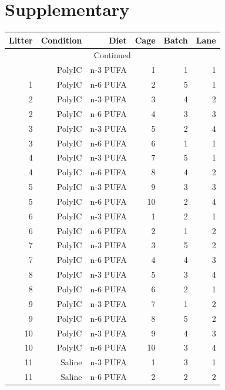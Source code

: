 \documentclass[12pt]{scrbook}
\begin{document}
\section{Supplementary}
\begin{center}
	\begin{longtable}[H]{rrrrrr}
		\toprule
		Litter & Condition & Diet  & Cage  & Batch & Lane \\
		\midrule
		\endhead
		\hline
		\multicolumn{6}{c}{Continued}\\
		\bottomrule
		\endfoot
		\bottomrule
		\endlastfoot
		1     & PolyIC & n-3 PUFA & 1     & 1     & 1 \\
		1     & PolyIC & n-6 PUFA & 2     & 5     & 1 \\
		2     & PolyIC & n-3 PUFA & 3     & 4     & 2 \\
		2     & PolyIC & n-6 PUFA & 4     & 3     & 3 \\
		3     & PolyIC & n-3 PUFA & 5     & 2     & 4 \\
		3     & PolyIC & n-6 PUFA & 6     & 1     & 1 \\
		4     & PolyIC & n-3 PUFA & 7     & 5     & 1 \\
		4     & PolyIC & n-6 PUFA & 8     & 4     & 2 \\
		5     & PolyIC & n-3 PUFA & 9     & 3     & 3 \\
		5     & PolyIC & n-6 PUFA & 10    & 2     & 4 \\
		6     & PolyIC & n-3 PUFA & 1     & 2     & 1 \\
		6     & PolyIC & n-6 PUFA & 2     & 1     & 2 \\
		7     & PolyIC & n-3 PUFA & 3     & 5     & 2 \\
		7     & PolyIC & n-6 PUFA & 4     & 4     & 3 \\
		8     & PolyIC & n-3 PUFA & 5     & 3     & 4 \\
		8     & PolyIC & n-6 PUFA & 6     & 2     & 1 \\
		9     & PolyIC & n-3 PUFA & 7     & 1     & 2 \\
		9     & PolyIC & n-6 PUFA & 8     & 5     & 2 \\
		10    & PolyIC & n-3 PUFA & 9     & 4     & 3 \\
		10    & PolyIC & n-6 PUFA & 10    & 3     & 4 \\
		11    & Saline & n-3 PUFA & 1     & 3     & 1 \\
		11    & Saline & n-6 PUFA & 2     & 2     & 2 \\

\end{longtable}
\end{center}
\end{document}
